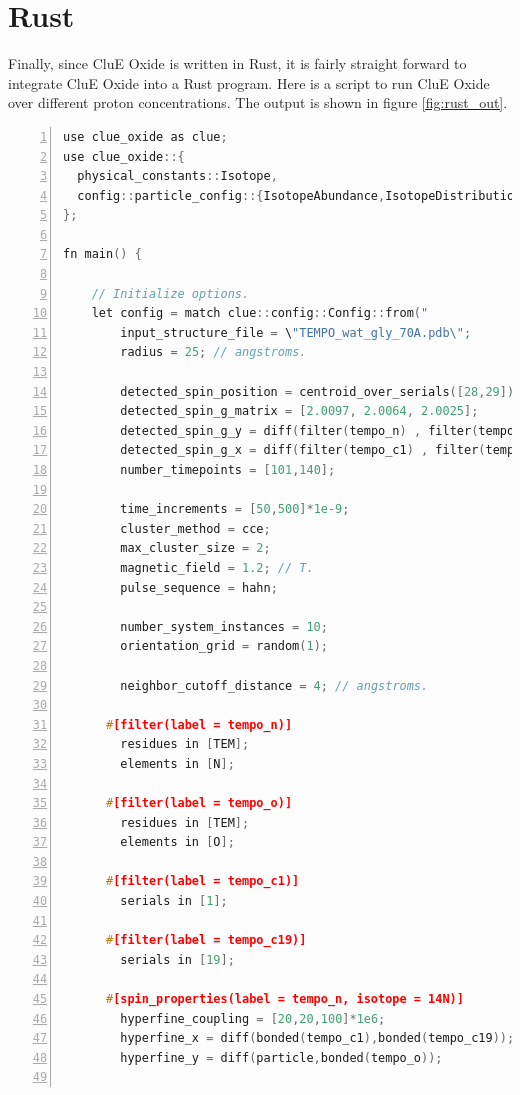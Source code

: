 \documentclass{book}
\begin{document}
\section{Rust}
Finally, since CluE Oxide is written in Rust, it is fairly straight forward to 
integrate CluE Oxide into a Rust program. 
Here is a script to run CluE Oxide over different proton concentrations.
The output is shown in figure \ref{fig:rust_out}.
\begin{lstlisting}[frame=single,numbers=left,language=c]
use clue_oxide as clue;
use clue_oxide::{
  physical_constants::Isotope,
  config::particle_config::{IsotopeAbundance,IsotopeDistribution}
};

fn main() {

    // Initialize options.
    let config = match clue::config::Config::from("
        input_structure_file = \"TEMPO_wat_gly_70A.pdb\";
        radius = 25; // angstroms.

        detected_spin_position = centroid_over_serials([28,29]);
        detected_spin_g_matrix = [2.0097, 2.0064, 2.0025];
        detected_spin_g_y = diff(filter(tempo_n) , filter(tempo_o) );
        detected_spin_g_x = diff(filter(tempo_c1) , filter(tempo_c19) );
        number_timepoints = [101,140];

        time_increments = [50,500]*1e-9;
        cluster_method = cce;
        max_cluster_size = 2;
        magnetic_field = 1.2; // T.
        pulse_sequence = hahn;

        number_system_instances = 10;
        orientation_grid = random(1);

        neighbor_cutoff_distance = 4; // angstroms.

      #[filter(label = tempo_n)]
        residues in [TEM];
        elements in [N];

      #[filter(label = tempo_o)]
        residues in [TEM];
        elements in [O];

      #[filter(label = tempo_c1)]
        serials in [1];

      #[filter(label = tempo_c19)]
        serials in [19];

      #[spin_properties(label = tempo_n, isotope = 14N)]
        hyperfine_coupling = [20,20,100]*1e6;
        hyperfine_x = diff(bonded(tempo_c1),bonded(tempo_c19));
        hyperfine_y = diff(particle,bonded(tempo_o));


\end{lstlisting}
\end{document}
